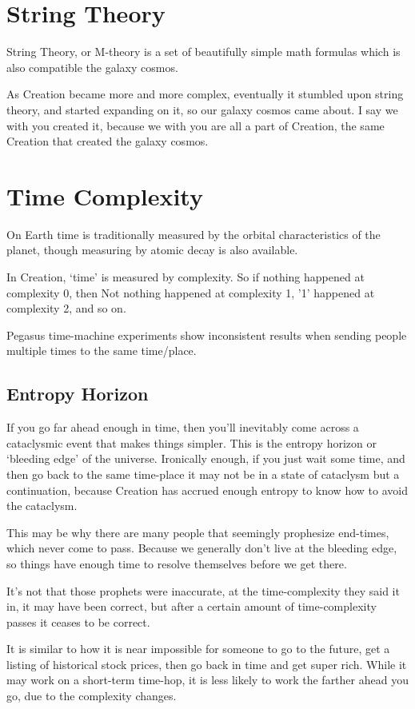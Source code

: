 \documentclass{report}
\begin{document}
\section{String Theory}

String Theory, or M-theory is a set of beautifully simple math formulas which is
also compatible the galaxy cosmos.

As Creation became more and more complex, eventually it stumbled upon string
theory, and started expanding on it, so our galaxy cosmos came about.  I say we
with you created it, because we with you are all a part of Creation, the same
Creation that created the galaxy cosmos. 

\section{Time Complexity}

On Earth time is traditionally measured by the orbital characteristics of the
planet, though measuring by atomic decay is also available. 

In Creation, `time' is measured by complexity. So if nothing happened at
complexity 0, then Not nothing happened at complexity 1, '1' happened at
complexity 2, and so on. 

Pegasus time-machine experiments show inconsistent results when sending people
multiple times to the same time/place.  

\subsection{Entropy Horizon}

If you go far ahead enough in time, then you'll inevitably come across a
cataclysmic event that makes things simpler.  This is the entropy horizon or
`bleeding edge' of the universe.   Ironically enough, if you just wait some
time, and then go back to the same time-place it may not be in a state of
cataclysm but a continuation,  because Creation has accrued enough entropy to
know how to avoid the cataclysm. 

This may be why there are many people that seemingly prophesize end-times, which
never come to pass.  Because we generally don't live at the bleeding edge, so
things have enough time to resolve themselves before we get there. 

It's not that those prophets were inaccurate, at the time-complexity they said
it in, it may have been correct, but after a certain amount of time-complexity 
passes it ceases to be correct. 

It is similar to how it is near impossible for someone to go to the future, get
a listing of historical stock prices, then go back in time and get super rich.
While it may work on a short-term time-hop, it is less likely to work the
farther ahead you go, due to the complexity changes. 
\end{document}
